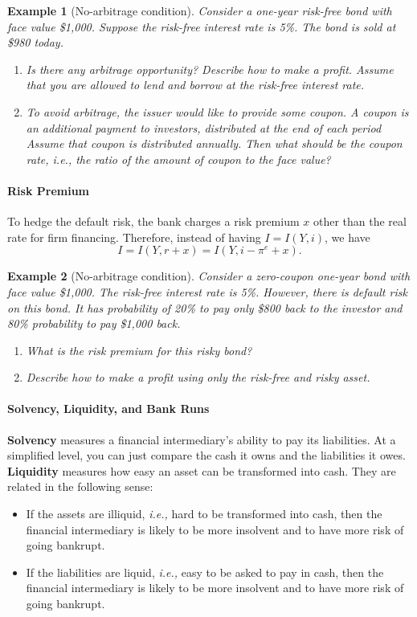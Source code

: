 \documentclass[12pt]{article}
\newtheorem{example}{Example}
\begin{document}
\begin{example}[No-arbitrage condition]
    Consider a one-year risk-free bond with face value \$1,000. Suppose the risk-free interest rate is 5\%. The bond is sold at \$980 today.
    \begin{enumerate}[label=(\arabic*)]
        \item Is there any arbitrage opportunity? Describe how to make a profit. Assume that you are allowed to lend and borrow at the risk-free interest rate.
        \item To avoid arbitrage, the issuer would like to provide some coupon. A coupon is an additional payment to investors, distributed at the end of each period Assume that coupon is distributed annually. Then what should be the coupon rate, i.e., the ratio of the amount of coupon to the face value?
    \end{enumerate}
\end{example}


\paragraph{Risk Premium}
To hedge the default risk, the bank charges a risk premium $x$ other than the real rate for firm financing. Therefore, instead of having $I = I(Y,i)$, we have
\[ I = I (Y, r+x) = I(Y, i-\pi^e+x).\]

\begin{example}[No-arbitrage condition]
    Consider a zero-coupon one-year bond with face value \$1,000. The risk-free interest rate is 5\%. However, there is default risk on this bond. It has probability of 20\% to pay only \$800 back to the investor and 80\% probability to pay \$1,000 back. 
    \begin{enumerate}[label=(\arabic*)]
        \item What is the risk premium for this risky bond?
        \item Describe how to make a profit using only the risk-free and risky asset.
    \end{enumerate}
\end{example}

\paragraph{Solvency, Liquidity, and Bank Runs}
\textbf{Solvency} measures a financial intermediary's ability to pay its liabilities. At a simplified level, you can just compare the cash it owns and the liabilities it owes. \textbf{Liquidity} measures how easy an asset can be transformed into cash. They are related in the following sense:
\begin{itemize}
    \item If the assets are illiquid, \textit{i.e.,} hard to be transformed into cash, then the financial intermediary is likely to be more insolvent and to have more risk of going bankrupt.
    \item If the liabilities are liquid, \textit{i.e.,} easy to be asked to pay in cash, then the financial intermediary is likely to be more insolvent and to have more risk of going bankrupt.
\end{itemize}
\end{document}
